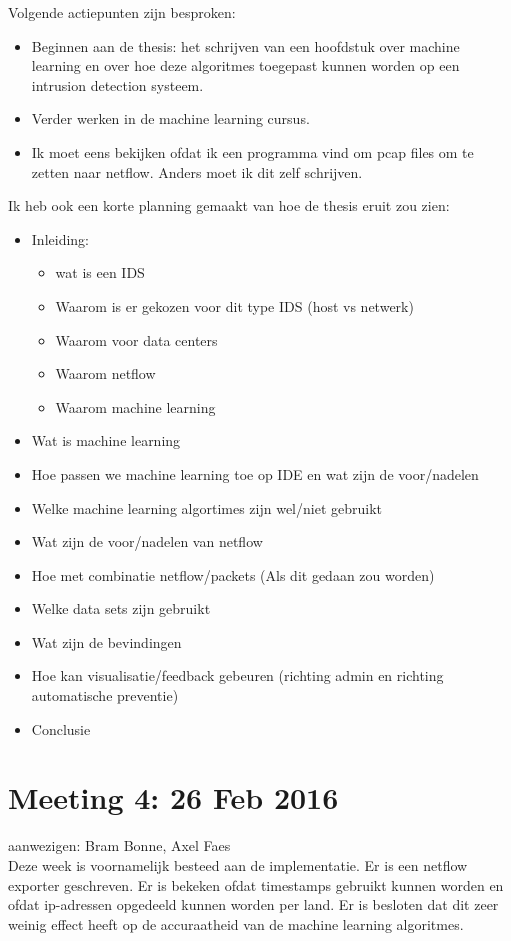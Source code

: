 \noindent Volgende actiepunten zijn besproken:
\begin{itemize}  
        \item Beginnen aan de thesis: het schrijven van een hoofdstuk over machine learning en over hoe deze algoritmes toegepast kunnen worden op een intrusion detection systeem.
        \item Verder werken in de machine learning cursus.
        \item Ik moet eens bekijken ofdat ik een programma vind om pcap files om te zetten naar netflow. Anders moet ik dit zelf schrijven.
\end{itemize}

\noindent Ik heb ook een korte planning gemaakt van hoe de thesis eruit zou zien:
\begin{itemize}  
\item Inleiding:
\begin{itemize}  
    \item wat is een IDS
    \item Waarom is er gekozen voor dit type IDS (host vs netwerk)
    \item Waarom voor data centers
    \item Waarom netflow
    \item Waarom machine learning
\end{itemize}
\item Wat is machine learning
\item Hoe passen we machine learning toe op IDE en wat zijn de voor/nadelen
\item Welke machine learning algortimes zijn wel/niet gebruikt
\item Wat zijn de voor/nadelen van netflow
\item Hoe met combinatie netflow/packets (Als dit gedaan zou worden)
\item Welke data sets zijn gebruikt
\item Wat zijn de bevindingen
\item Hoe kan visualisatie/feedback gebeuren (richting admin en richting automatische preventie)
\item Conclusie
\end{itemize}
\section{Meeting 4: 26 Feb 2016}
aanwezigen: Bram Bonne, Axel Faes\\

\noindent Deze week is voornamelijk besteed aan de implementatie. Er is een netflow exporter geschreven. Er is bekeken ofdat timestamps gebruikt kunnen worden en ofdat ip-adressen opgedeeld kunnen worden per land. Er is besloten dat dit zeer weinig effect heeft op de accuraatheid van de machine learning algoritmes.\\

